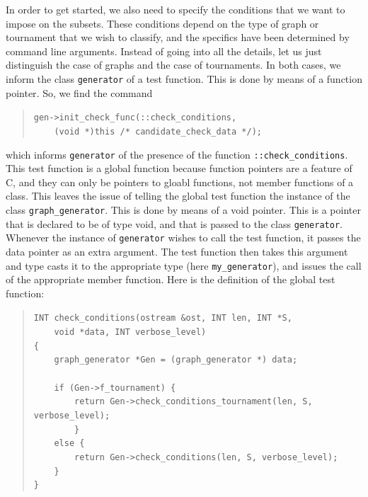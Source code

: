 In order to get started, we also need to specify the conditions that 
we want to impose on the subsets. 
These conditions depend on the type of graph or tournament that we 
wish to classify, and the specifics have been determined by command line arguments. 
Instead of going into all the details, let us just distinguish the 
case of graphs and the case of tournaments. 
In both cases, we inform the class \verb'generator' of a test function. 
This is done by means of a function pointer.
So, we find the command 
\begin{quote}
\verb'gen->init_check_func(::check_conditions, '\\
\verb'    (void *)this /* candidate_check_data */);'\\
\end{quote}
which informs \verb'generator' of the presence of the function 
\verb'::check_conditions'. This test function is a global function 
because function pointers are a feature of C, and they can only be 
pointers to gloabl functions, not member functions of a class.
This leaves the issue of telling the global test function
the instance of the class \verb'graph_generator'. 
This is done by means of a void pointer. This is a pointer that 
is declared to be of type void, and that is passed to the class 
\verb'generator'. Whenever the instance of \verb'generator'
wishes to call the test function, it passes the data pointer as an extra argument. 
The test function then takes this argument and type casts it to 
the appropriate type (here \verb'my_generator'), and issues the 
call of the appropriate member function. 
Here is the definition of the global test function:
\begin{quote}
\verb'INT check_conditions(ostream &ost, INT len, INT *S, '\\
\verb'    void *data, INT verbose_level)'\\
\verb'{'\\
\verb'    graph_generator *Gen = (graph_generator *) data;'\\
\verb''\\
\verb'    if (Gen->f_tournament) {'\\
\verb'        return Gen->check_conditions_tournament(len, S, verbose_level);'\\
\verb'        }'\\
\verb'    else {'\\
\verb'        return Gen->check_conditions(len, S, verbose_level);'\\
\verb'    }'\\
\verb'}'\\
\end{quote}
